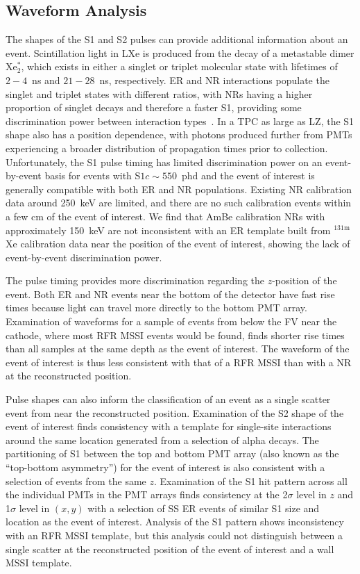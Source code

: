 \subsection{Waveform Analysis}
The shapes of the S1 and S2 pulses can provide additional information about an event. Scintillation light in LXe is produced from the decay of a metastable dimer Xe$^*_2$, which exists in either a singlet or triplet molecular state with lifetimes of $2-4$~ns and $21-28$~ns, respectively.
ER and NR interactions populate the singlet and triplet states with different ratios, with NRs having a higher proportion of singlet decays and therefore a faster S1, providing some discrimination power between interaction types~\cite{PSD:Theory,PSD:time1,PSD:time2,PSD:time3,XMASS:2018hil,LZ:PSD_2026}.
In a TPC as large as LZ, the S1 shape also has a position dependence, with photons produced further from PMTs experiencing a broader distribution of propagation times prior to collection.
Unfortunately, the S1 pulse timing has limited discrimination power on an event-by-event basis for events with S$1c\sim550$~phd and the event of interest is generally compatible with both ER and NR populations. Existing NR calibration data around 250~keV are limited, and there are no such calibration events within a few cm of the event of interest. We find that AmBe calibration NRs with approximately 150~keV are not inconsistent with an ER template built from $^{131\text{m}}$Xe calibration data near the position of the event of interest, showing the lack of event-by-event discrimination power.  

The pulse timing provides more discrimination regarding the $z$-position of the event. Both ER and NR events near the bottom of the detector have fast rise times because light can travel more directly to the bottom PMT array.  Examination of waveforms for a sample of events from below the FV near the cathode, where most RFR MSSI events would be found, finds shorter rise times than all samples at the same depth as the event of interest. The waveform of the event of interest is thus less consistent with that of a RFR MSSI than with a NR at the reconstructed position.

Pulse shapes can also inform the classification of an event as a single scatter event from near the reconstructed position. Examination of the S2 shape of the event of interest finds consistency with a template for single-site interactions around the same location generated from a selection of alpha decays. The partitioning of S1 between the top and bottom PMT array (also known as the ``top-bottom asymmetry'') for the event of interest is also consistent with a selection of events from the same $z$. Examination of the S1 hit pattern across all the individual PMTs in the PMT arrays finds consistency at the 2$\sigma$ level in $z$ and 1$\sigma$ level in $(x,y)$ with a selection of SS ER events of similar S1 size and location as the event of interest. Analysis of the S1 pattern shows inconsistency with an RFR MSSI template, but this analysis could not distinguish between a single scatter at the reconstructed position of the event of interest and a wall MSSI template.  

